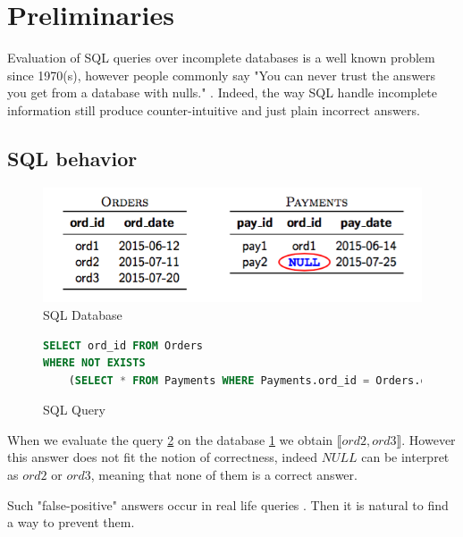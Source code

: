 \section{Preliminaries}
Evaluation of SQL queries over incomplete databases is a well known problem since 1970(s), however people commonly say "You can never trust the answers you get from a database with nulls." \cite{date2005database}. 
Indeed, the way SQL handle incomplete information still produce counter-intuitive and just plain incorrect answers.

\subsection{SQL behavior}
\begin{figure}[h]
	\caption{\label{db} SQL Database}
	\includegraphics[scale=0.5]{query1}
\end{figure}

\begin{figure}[h]
	\caption{\label{query} SQL Query}
\begin{lstlisting}[language=SQL]
SELECT ord_id FROM Orders 
WHERE NOT EXISTS  
	(SELECT * FROM Payments WHERE Payments.ord_id = Orders.ord_id)
\end{lstlisting}
\end{figure}



When we evaluate the query \ref{query} on the database \ref{db} we obtain $\llbracket ord2,ord3\rrbracket$. However this answer does not fit the notion of correctness, indeed $NULL$ can be interpret as $ord2$ or $ord3$, meaning that none of them is a correct answer. 

Such "false-positive" answers occur in real life queries \cite{guagliardo2016making}. Then it is natural to find a way to prevent them.  










